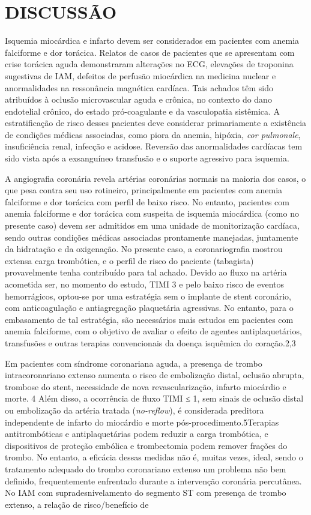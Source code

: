\section*{DISCUSSÃO}\par Isquemia miocárdica e infarto devem ser considerados em pacientes com anemia falciforme e dor torácica. Relatos de casos de pacientes que se apresentam com crise torácica aguda demonstraram alterações no ECG, elevações de troponina sugestivas de IAM, defeitos de perfusão miocárdica na medicina nuclear e anormalidades na ressonância magnética cardíaca. Tais achados têm sido atribuídos à oclusão microvascular aguda e crônica, no contexto do dano endotelial crônico, do estado pró-coagulante e da vasculopatia sistêmica. A estratificação de risco desses pacientes deve considerar primariamente a existência de condições médicas associadas, como piora da anemia, hipóxia, \textit{cor pulmonale}, insuficiência renal, infecção e acidose. Reversão das anormalidades cardíacas tem sido vista após a exsanguíneo transfusão e o suporte agressivo para isquemia.\par A angiografia coronária revela artérias coronárias normais na maioria dos casos, o que pesa contra seu uso rotineiro, principalmente em pacientes com anemia falciforme e dor torácica com perfil de baixo risco. No entanto, pacientes com anemia falciforme e dor torácica com suspeita de isquemia miocárdica (como no presente caso) devem ser admitidos em uma unidade de monitorização cardíaca, sendo outras condições médicas associadas prontamente manejadas, juntamente da hidratação e da oxigenação. No presente caso, a coronariografia mostrou extensa carga trombótica, e o perfil de risco do paciente (tabagista) provavelmente tenha contribuído para tal achado. Devido ao fluxo na artéria acometida ser, no momento do estudo, TIMI 3 e pelo baixo risco de eventos hemorrágicos, optou-se por uma estratégia sem o implante de stent coronário, com anticoagulação e antiagregação plaquetária agressivas. No entanto, para o embasamento de tal estratégia, são necessários mais estudos em pacientes com anemia falciforme, com o objetivo de avaliar o efeito de agentes antiplaquetários, transfusões e outras terapias convencionais da doença isquêmica do coração.2,3\par Em pacientes com síndrome coronariana aguda, a presença de trombo intracoronariano extenso aumenta o risco de embolização distal, oclusão abrupta, trombose do stent, necessidade de nova revascularização, infarto miocárdio e morte. 4 Além disso, a ocorrência de fluxo TIMI ≤ 1, sem sinais de oclusão distal ou embolização da artéria tratada (\textit{no-reflow}), é considerada preditora independente de infarto do miocárdio e morte pós-procedimento.5Terapias antitrombóticas e antiplaquetárias podem reduzir a carga trombótica, e dispositivos de proteção embólica e trombectomia podem remover frações do trombo. No entanto, a eficácia dessas medidas não é, muitas vezes, ideal, sendo o tratamento adequado do trombo coronariano extenso um problema não bem definido, frequentemente enfrentado durante a intervenção coronária percutânea. No IAM com supradesnivelamento do segmento ST com presença de trombo extenso, a relação de risco/benefício de 